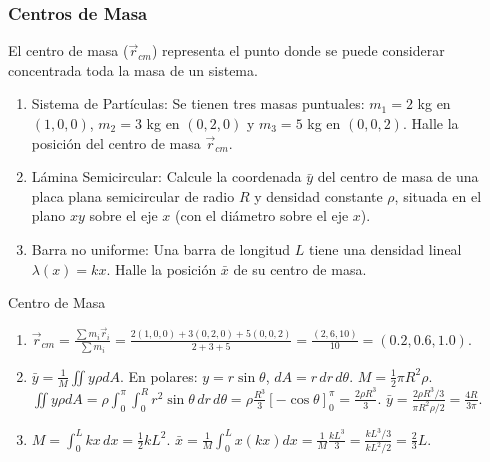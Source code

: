 \subsubsection{Centros de Masa}
El centro de masa ($\vec{r}_{cm}$) representa el punto donde se puede considerar concentrada toda la masa de un sistema.

\begin{enumerate}
    \item Sistema de Partículas: Se tienen tres masas puntuales: $m_1 = 2$ kg en $(1, 0, 0)$, $m_2 = 3$ kg en $(0, 2, 0)$ y $m_3 = 5$ kg en $(0, 0, 2)$. Halle la posición del centro de masa $\vec{r}_{cm}$.
    \item Lámina Semicircular: Calcule la coordenada $\bar{y}$ del centro de masa de una placa plana semicircular de radio $R$ y densidad constante $\rho$, situada en el plano $xy$ sobre el eje $x$ (con el diámetro sobre el eje $x$).
    \item Barra no uniforme: Una barra de longitud $L$ tiene una densidad lineal $\lambda(x) = kx$. Halle la posición $\bar{x}$ de su centro de masa.
\end{enumerate}
\begin{solucion}{Centro de Masa}
\begin{enumerate}
    \item $\vec{r}_{cm} = \frac{\sum m_i \vec{r}_i}{\sum m_i} = \frac{2(1,0,0) + 3(0,2,0) + 5(0,0,2)}{2+3+5} = \frac{(2, 6, 10)}{10} = (0.2, 0.6, 1.0)$.
    \item $\bar{y} = \frac{1}{M} \iint y \rho dA$. En polares: $y = r\sin\theta$, $dA = r \, dr \, d\theta$.
    $M = \frac{1}{2}\pi R^2 \rho$. 
    $\iint y \rho dA = \rho \int_0^\pi \int_0^R r^2 \sin\theta \, dr \, d\theta = \rho \frac{R^3}{3} [-\cos\theta]_0^\pi = \frac{2\rho R^3}{3}$.
    $\bar{y} = \frac{2\rho R^3 / 3}{\pi R^2 \rho / 2} = \frac{4R}{3\pi}$.
    \item $M = \int_0^L kx \, dx = \frac{1}{2}kL^2$. 
    $\bar{x} = \frac{1}{M} \int_0^L x (kx) dx = \frac{1}{M} \frac{kL^3}{3} = \frac{kL^3/3}{kL^2/2} = \frac{2}{3}L$.
\end{enumerate}
\end{solucion}
